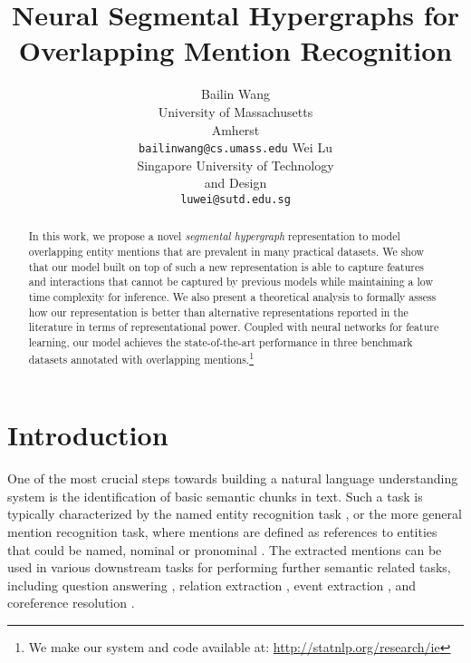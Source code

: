 \documentclass[11pt,a4paper]{article}
\title{Neural Segmental Hypergraphs for Overlapping Mention Recognition}
\author{
Bailin Wang \\
University of Massachusetts \\ Amherst \\
  {\tt bailinwang@cs.umass.edu} 
  \And
Wei Lu  \\
Singapore University of Technology \\ and Design \\
  {\tt luwei@sutd.edu.sg} 
  }
\date{}
\theoremstyle{theorem}
\begin{document}
\maketitle
\begin{abstract}
In this work, we propose a novel {\em segmental hypergraph} representation to model overlapping entity mentions that are prevalent in many practical datasets.
We show that our model built on top of such a new representation is able to capture features {\color{black}and interactions} that cannot be captured by previous models while maintaining a low time complexity for inference.
We also present a theoretical analysis to formally assess how our representation is better than alternative representations reported in the literature in terms of representational power.
Coupled with neural networks for feature learning, our model achieves the state-of-the-art performance in three benchmark datasets annotated with overlapping mentions.\footnote{{\color{black} We make our system and code available at: \url{http://statnlp.org/research/ie} }}
\end{abstract}

\section{Introduction}



One of the most crucial steps towards building a natural language understanding system is the identification of basic semantic chunks in text. 
Such a task is typically characterized by the named entity recognition task \cite{grishman1997information,tjong2003introduction}, or the more general mention recognition task, where mentions are defined as references to entities that could be named, nominal or pronominal \cite{florian2004statistical}.
The extracted mentions can be used in various downstream tasks for performing further semantic related tasks, including question answering \cite{abney2000answer}, relation extraction \cite{mintz2009distant,liu2017heterogeneous}, event extraction \cite{riedel2011fast,li-ji-huang:2013:ACL2013}, and coreference resolution \cite{soon2001machine,ng2002improving,chang2013constrained}.
\end{document}
